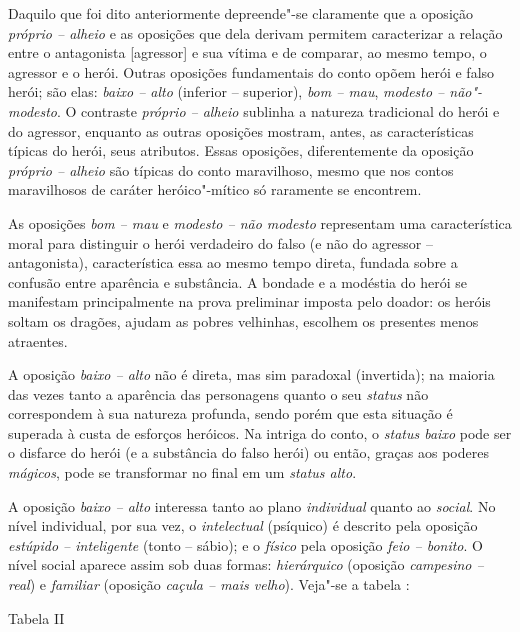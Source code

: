 Daquilo que foi dito anteriormente depreende"-se claramente que a
oposição \emph{próprio -- alheio} e as oposições que dela derivam permitem
caracterizar a relação entre o antagonista [agressor] e sua vítima e
de comparar, ao mesmo tempo, o agressor e o herói. Outras oposições
fundamentais do conto opõem herói e falso herói; são elas: \emph{baixo --
alto} (inferior -- superior), \emph{bom -- mau}, \emph{modesto -- não"-modesto}. O
contraste \emph{próprio -- alheio} sublinha a natureza tradicional do herói e
do agressor, enquanto as outras oposições mostram, antes, as
características típicas do herói, seus atributos. Essas oposições,
diferentemente da oposição \emph{próprio -- alheio} são típicas do conto
maravilhoso, mesmo que nos contos maravilhosos de caráter heróico"-mítico
só raramente se encontrem.

As oposições \emph{bom -- mau} e \emph{modesto -- não modesto} representam uma
característica moral para distinguir o herói verdadeiro do falso (e não
do agressor -- antagonista), característica essa ao mesmo tempo direta,
fundada sobre a confusão entre aparência e substância. A bondade e a
modéstia do herói se manifestam principalmente na prova preliminar
imposta pelo doador: os heróis soltam os dragões, ajudam as pobres
velhinhas, escolhem os presentes menos atraentes.

A oposição \emph{baixo -- alto} não é direta, mas sim paradoxal (invertida);
na maioria das vezes tanto a aparência das personagens quanto o
seu \emph{status} não correspondem à sua natureza profunda, sendo porém que
esta situação é superada à custa de esforços heróicos. Na intriga do
conto, o \emph{status baixo} pode ser o disfarce do herói (e a substância
do falso herói) ou então, graças aos poderes \emph{mágicos}, pode se
transformar no final em um \emph{status alto}.

A oposição \emph{baixo -- alto} interessa tanto ao plano \emph{individual} quanto
ao \emph{social}. No nível individual, por sua vez,
o \emph{intelectual} (psíquico) é descrito pela oposição \emph{estúpido --
inteligente} (tonto -- sábio); e o \emph{físico} pela oposição \emph{feio --
bonito}. O nível social aparece assim sob duas
formas: \emph{hierárquico} (oposição \emph{campesino -- real})
e \emph{familiar} (oposição \emph{caçula -- mais velho}). Veja"-se a tabela :

Tabela II


